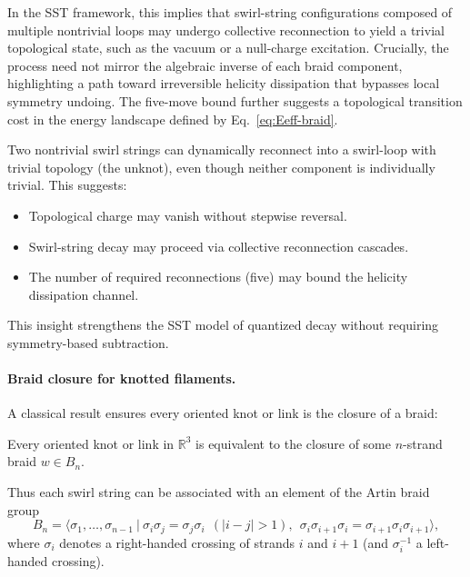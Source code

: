 \documentclass[10pt,reprint,aps,onecolumn,nofootinbib]{revtex4-2}
\begin{document}
        In the SST framework, this implies that swirl-string configurations composed of multiple nontrivial loops may undergo collective reconnection to yield a trivial topological state, such as the vacuum or a null-charge excitation. Crucially, the process need not mirror the algebraic inverse of each braid component, highlighting a path toward irreversible helicity dissipation that bypasses local symmetry undoing. The five-move bound further suggests a topological transition cost in the energy landscape defined by Eq.~\eqref{eq:Eeff-braid}.


        \begin{tcolorbox}[colframe=gray,title={Implication of Knot Fusion in SST}]
        Two nontrivial swirl strings can dynamically reconnect into a swirl-loop with trivial topology (the unknot), even though neither component is individually trivial.
        This suggests:
        \begin{itemize}
        \item Topological charge may vanish without stepwise reversal.
        \item Swirl-string decay may proceed via collective reconnection cascades.
        \item The number of required reconnections (five) may bound the helicity dissipation channel.
        \end{itemize}
        This insight strengthens the SST model of quantized decay without requiring symmetry-based subtraction.
        \end{tcolorbox}

        \paragraph*{Braid closure for knotted filaments.}
            A classical result ensures every oriented knot or link is the closure of a braid:

            \begin{theorem}
            Every oriented knot or link in \(\mathbb{R}^3\) is equivalent to the closure of some \(n\)-strand braid \(w\in B_n\).
            \end{theorem}

            Thus each swirl string can be associated with an element of the Artin braid group
            \[
                B_n = \big\langle \sigma_1,\dots,\sigma_{n-1}\ \big|\
                \sigma_i\sigma_j=\sigma_j\sigma_i\ \ (|i-j|>1),\ \
                \sigma_i\sigma_{i+1}\sigma_i=\sigma_{i+1}\sigma_i\sigma_{i+1}
                \big\rangle,
            \]
            where \(\sigma_i\) denotes a right-handed crossing of strands \(i\) and \(i{+}1\) (and \(\sigma_i^{-1}\) a left-handed crossing).
\end{document}
